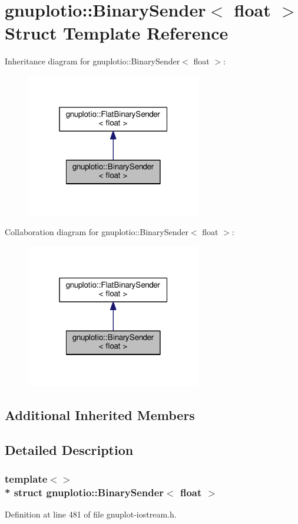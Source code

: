 \hypertarget{structgnuplotio_1_1_binary_sender_3_01float_01_4}{}\section{gnuplotio\+:\+:Binary\+Sender$<$ float $>$ Struct Template Reference}
\label{structgnuplotio_1_1_binary_sender_3_01float_01_4}


Inheritance diagram for gnuplotio\+:\+:Binary\+Sender$<$ float $>$\+:
\nopagebreak
\begin{figure}[H]
\begin{center}
\leavevmode
\includegraphics[width=217pt]{structgnuplotio_1_1_binary_sender_3_01float_01_4__inherit__graph}
\end{center}
\end{figure}


Collaboration diagram for gnuplotio\+:\+:Binary\+Sender$<$ float $>$\+:
\nopagebreak
\begin{figure}[H]
\begin{center}
\leavevmode
\includegraphics[width=217pt]{structgnuplotio_1_1_binary_sender_3_01float_01_4__coll__graph}
\end{center}
\end{figure}
\subsection*{Additional Inherited Members}


\subsection{Detailed Description}
\subsubsection*{template$<$$>$\\*
struct gnuplotio\+::\+Binary\+Sender$<$ float $>$}



Definition at line 481 of file gnuplot-\/iostream.\+h.

